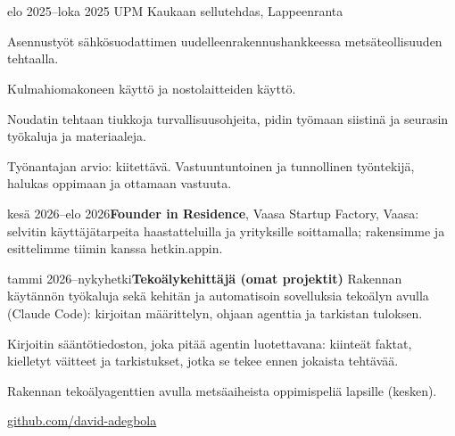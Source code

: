 \documentclass[a4paper,11pt]{article}
\begin{document}
\section{}

\section{}
\begin{cventry}{elo 2025--loka 2025}{}
  UPM Kaukaan sellutehdas, Lappeenranta\par
  Asennustyöt sähkösuodattimen uudelleenrakennushankkeessa metsäteollisuuden tehtaalla.\par
  Kulmahiomakoneen käyttö ja nostolaitteiden käyttö.\par
  Noudatin tehtaan tiukkoja turvallisuusohjeita, pidin työmaan siistinä ja seurasin työkaluja ja materiaaleja.\par
  Työnantajan arvio: kiitettävä. Vastuuntuntoinen ja tunnollinen työntekijä, halukas oppimaan ja ottamaan vastuuta.
\end{cventry}
\begin{cventry}{kesä 2026--elo 2026}{\textbf{Founder in Residence}, Vaasa Startup Factory, Vaasa: selvitin käyttäjätarpeita haastatteluilla ja yrityksille soittamalla; rakensimme ja esittelimme tiimin kanssa hetkin.appin.}
\end{cventry}
\begin{cventry}{tammi 2026--nykyhetki}{\textbf{Tekoälykehittäjä (omat projektit)}}
  Rakennan käytännön työkaluja sekä kehitän ja automatisoin sovelluksia tekoälyn avulla (Claude Code): kirjoitan määrittelyn, ohjaan agenttia ja tarkistan tuloksen.\par
  Kirjoitin sääntötiedoston, joka pitää agentin luotettavana: kiinteät faktat, kielletyt väitteet ja tarkistukset, jotka se tekee ennen jokaista tehtävää.\par
  Rakennan tekoälyagenttien avulla metsäaiheista oppimispeliä lapsille (kesken).\par
  \faGithub{} \href{https://github.com/david-adegbola}{github.com/david-adegbola}
\end{cventry}
\end{document}
